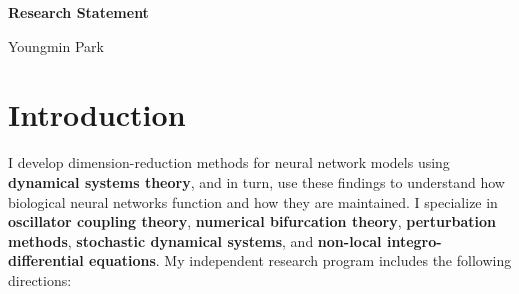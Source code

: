 \documentclass[a4paper,11pt]{article}
\begin{document}
	
	\begin{center}
		\Large \textbf{Research Statement}
		
		\Large Youngmin Park
	\end{center}
	
	
	\section{Introduction}

I develop dimension-reduction methods for neural network models using \textbf{dynamical systems theory}, and in turn, use these findings to understand how biological neural networks function and how they are maintained. I specialize in \textbf{oscillator coupling theory}, \textbf{numerical bifurcation theory}, \textbf{perturbation methods}, \textbf{stochastic dynamical systems}, and \textbf{non-local integro-differential equations}. My independent research program includes the following directions:
\end{document}
